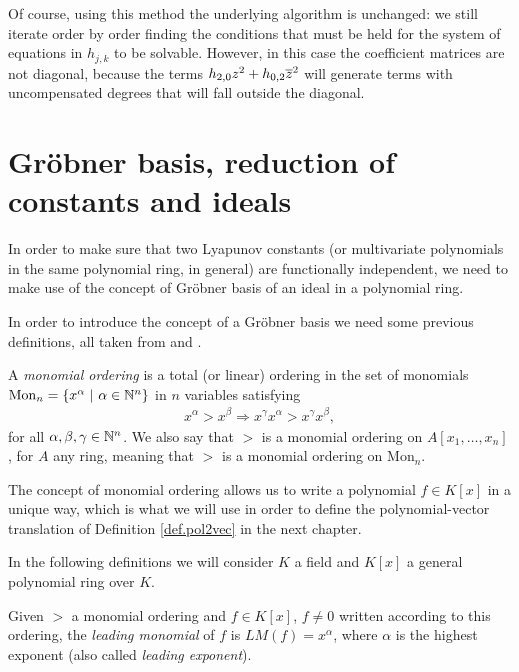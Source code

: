 Of course, using this method the underlying algorithm is unchanged: we still iterate order by order finding the conditions that must be held for the system of equations in $h_{j,k}$ to be solvable. However, in this case the coefficient matrices are not diagonal, because the terms $h_{2,0}z^2+h_{0,2}\overline{z}^2$ will generate terms with uncompensated degrees that will fall outside the diagonal.


\section{Gröbner basis, reduction of constants and ideals}

In order to make sure that two Lyapunov constants (or multivariate polynomials in the same polynomial ring, in general) are functionally independent, we need to make use of the concept of Gröbner basis of an ideal in a polynomial ring.

In order to introduce the concept of a Gröbner basis we need some previous definitions, all taken from \textcite{Becker1993} and \textcite{Greuel2007}.
\begin{definicio}
A \emph{monomial ordering} is a total (or linear) ordering in the set of monomials $\mathrm{Mon}_n=\{x^\alpha~|~\alpha\in\mathbb{N}^n\}$ in $n$ variables satisfying
\begin{align*}
x^\alpha>x^\beta\Rightarrow x^\gamma x^\alpha>x^\gamma x^\beta,
\end{align*}
for all $\alpha,\beta,\gamma\in\mathbb{N}^n$. We also say that $>$ is a monomial ordering on $A[x_1,\dots,x_n]$, for $A$ any ring, meaning that $>$ is a monomial ordering on $\mathrm{Mon}_n$.
\end{definicio}

The concept of monomial ordering allows us to write a polynomial $f\in K[x]$ in a unique way, which is what we will use in order to define the polynomial-vector translation of Definition \ref{def.pol2vec} in the next chapter.

In the following definitions we will consider $K$ a field and $K[x]$ a general polynomial ring over $K$.

\begin{definicio}
Given $>$ a monomial ordering and $f\in K[x]$, $f\ne0$ written according to this ordering, the \emph{leading monomial} of $f$ is $LM(f)=x^\alpha$, where $\alpha$ is the highest exponent (also called \emph{leading exponent}).
\end{definicio}


